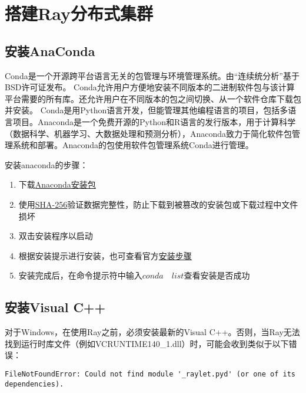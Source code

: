 \section{搭建Ray分布式集群}

\subsection{安装AnaConda}
Conda是一个开源跨平台语言无关的包管理与环境管理系统。由“连续统分析”基于BSD许可证发布。 Conda允许用户方便地安装不同版本的二进制软件包与该计算平台需要的所有库。还允许用户在不同版本的包之间切换、从一个软件仓库下载包并安装。 Conda是用Python语言开发，但能管理其他编程语言的项目，包括多语言项目。Anaconda是一个免费开源的Python和R语言的发行版本，用于计算科学（数据科学、机器学习、大数据处理和预测分析），Anaconda致力于简化软件包管理系统和部署。Anaconda的包使用软件包管理系统Conda进行管理。

安装anaconda的步骤：
\begin{enumerate}
    \item 下载\href{https://www.anaconda.com/download/#windows}{Anaconda安装包}
    \item 使用\href{https://docs.anaconda.com/anaconda/install/hashes/}{SHA-256}验证数据完整性，防止下载到被篡改的安装包或下载过程中文件损坏
    \item 双击安装程序以启动
    \item 根据安装提示进行安装，也可查看官方\href{https://docs.anaconda.com/anaconda/install/windows/}{安装步骤}
    \item 安装完成后，在命令提示符中输入$ conda \quad list $查看安装是否成功
\end{enumerate}

\subsection{安装Visual C++}
对于Windows，在使用Ray之前，必须安装最新的Visual C++。否则，当Ray无法找到运行时库文件（例如VCRUNTIME140\_1.dll）时，可能会收到类似于以下错误：
\lstset{language=Bash, breaklines, columns=flexible}
\begin{lstlisting}
FileNotFoundError: Could not find module '_raylet.pyd' (or one of its dependencies).
\end{lstlisting}

